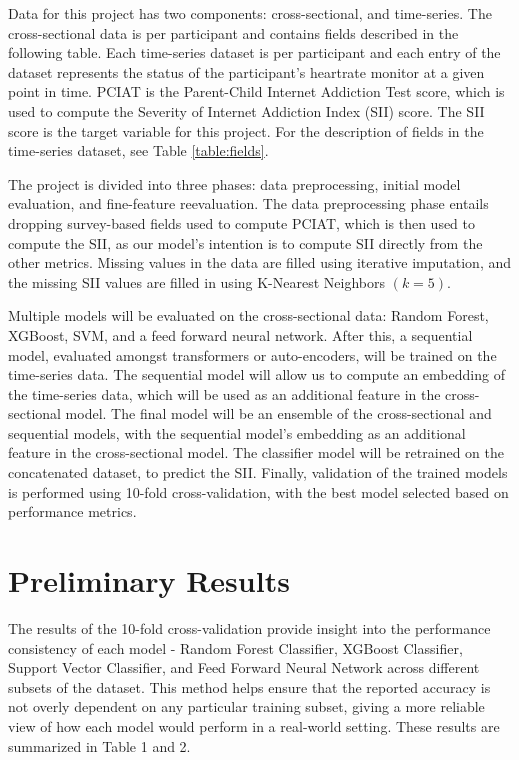 \documentclass[12pt]{extarticle}
\begin{document}
    Data for this project has two components: cross-sectional, and time-series. The cross-sectional data is per participant and contains fields described in the following table.
    Each time-series dataset is per participant and each entry of the dataset represents the status of the participant's heartrate monitor at a given point in time. 
    PCIAT is the Parent-Child Internet Addiction Test score, which is used to compute the Severity of Internet Addiction Index (SII) score. 
    The SII score is the target variable for this project. For the description of fields in the time-series dataset, see Table \ref{table:fields}.

    The project is divided into three phases: data preprocessing, initial model evaluation, and fine-feature reevaluation.
    The data preprocessing phase entails dropping survey-based fields used to compute PCIAT, which is then used to compute the SII, as our model's intention is to compute SII directly from the other metrics.
    Missing values in the data are filled using iterative imputation, and the missing SII values are filled in using K-Nearest Neighbors $(k=5)$.

    Multiple models will be evaluated on the cross-sectional data: Random Forest, XGBoost, SVM, and a feed forward neural network. After this, a sequential model, evaluated amongst transformers or auto-encoders, will be trained on the time-series data. 
    The sequential model will allow us to compute an embedding of the time-series data, which will be used as an additional feature in the cross-sectional model.
    The final model will be an ensemble of the cross-sectional and sequential models, with the sequential model's embedding as an additional feature in the cross-sectional model. 
    The classifier model will be retrained on the concatenated dataset, to predict the SII.
    Finally, validation of the trained models is performed using 10-fold cross-validation, with the best model selected based on performance metrics.

\section{Preliminary Results} 

    The results of the 10-fold cross-validation provide insight into the performance consistency of each model - Random Forest Classifier, XGBoost Classifier, Support Vector Classifier, and Feed Forward Neural Network across different subsets of the dataset. 
    This method helps ensure that the reported accuracy is not overly dependent on any particular training subset, giving a more reliable view of how each model would perform in a real-world setting. 
    These results are summarized in Table 1 and 2.
\end{document}
